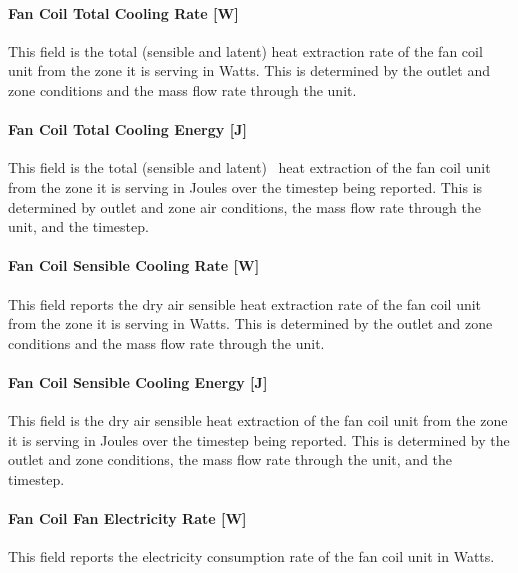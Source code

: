 \paragraph{Fan Coil Total Cooling Rate {[}W{]}}\label{fan-coil-total-cooling-rate-w}

This field is the total (sensible and latent) heat extraction rate of the fan coil unit from the zone it is serving in Watts. This is determined by the outlet and zone conditions and the mass flow rate through the unit.

\paragraph{Fan Coil Total Cooling Energy {[}J{]}}\label{fan-coil-total-cooling-energy-j}

This field is the total (sensible and latent)~ heat extraction of the fan coil unit from the zone it is serving in Joules over the timestep being reported. This is determined by outlet and zone air conditions, the mass flow rate through the unit, and the timestep.

\paragraph{Fan Coil Sensible Cooling Rate {[}W{]}}\label{fan-coil-sensible-cooling-rate-w}

This field reports the dry air sensible heat extraction rate of the fan coil unit from the zone it is serving in Watts. This is determined by the outlet and zone conditions and the mass flow rate through the unit.

\paragraph{Fan Coil Sensible Cooling Energy {[}J{]}}\label{fan-coil-sensible-cooling-energy-j}

This field is the dry air sensible heat extraction of the fan coil unit from the zone it is serving in Joules over the timestep being reported. This is determined by the outlet and zone conditions, the mass flow rate through the unit, and the timestep.

\paragraph{Fan Coil Fan Electricity Rate {[}W{]}}\label{fan-coil-fan-electric-power-w}

This field reports the electricity consumption rate of the fan coil unit in Watts.

